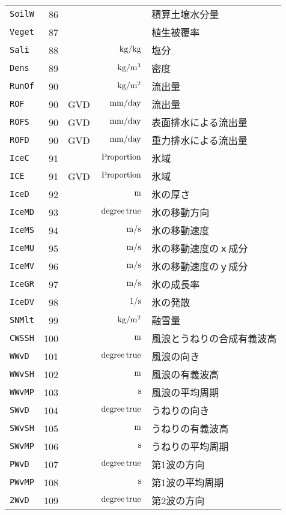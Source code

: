 \begin{longtable}{l|rrrp{}}
{\tt SoilW} & 86 &  &  & 積算土壌水分量 \\
{\tt Veget} & 87 &  &  & 植生被覆率 \\
{\tt Sali} & 88 &  & ${\rm\,kg/kg}$ & 塩分 \\
{\tt Dens} & 89 &  & ${\rm\,kg/m^3}$ & 密度 \\
{\tt RunOf} & 90 &  & ${\rm\,kg/m^2}$ & 流出量 \\
{\tt ROF} & 90 & GVD & ${\rm\,mm/day}$ & 流出量 \\
{\tt ROFS} & 90 & GVD & ${\rm\,mm/day}$ & 表面排水による流出量 \\
{\tt ROFD} & 90 & GVD & ${\rm\,mm/day}$ & 重力排水による流出量 \\
{\tt IceC} & 91 &  & ${\rm\,Proportion}$ & 氷域 \\
{\tt ICE} & 91 & GVD & ${\rm\,Proportion}$ & 氷域 \\
{\tt IceD} & 92 &  & ${\rm\,m}$ & 氷の厚さ \\
{\tt IceMD} & 93 &  & ${\rm\,degree\,true}$ & 氷の移動方向 \\
{\tt IceMS} & 94 &  & ${\rm\,m/s}$ & 氷の移動速度 \\
{\tt IceMU} & 95 &  & ${\rm\,m/s}$ & 氷の移動速度のｘ成分 \\
{\tt IceMV} & 96 &  & ${\rm\,m/s}$ & 氷の移動速度のｙ成分 \\
{\tt IceGR} & 97 &  & ${\rm\,m/s}$ & 氷の成長率 \\
{\tt IceDV} & 98 &  & ${\rm\,1/s}$ & 氷の発散 \\
{\tt SNMlt} & 99 &  & ${\rm\,kg/m^2}$ & 融雪量 \\
{\tt CWSSH} & 100 &  & ${\rm\,m}$ & 風浪とうねりの合成有義波高 \\
{\tt WWvD} & 101 &  & ${\rm\,degree\,true}$ & 風浪の向き \\
{\tt WWvSH} & 102 &  & ${\rm\,m}$ & 風浪の有義波高 \\
{\tt WWvMP} & 103 &  & ${\rm\,s}$ & 風浪の平均周期 \\
{\tt SWvD} & 104 &  & ${\rm\,degree\,true}$ & うねりの向き \\
{\tt SWvSH} & 105 &  & ${\rm\,m}$ & うねりの有義波高 \\
{\tt SWvMP} & 106 &  & ${\rm\,s}$ & うねりの平均周期 \\
{\tt PWvD} & 107 &  & ${\rm\,degree\,true}$ & 第1波の方向 \\
{\tt PWvMP} & 108 &  & ${\rm\,s}$ & 第1波の平均周期 \\
{\tt 2WvD} & 109 &  & ${\rm\,degree\,true}$ & 第2波の方向 \\

\end{longtable}

